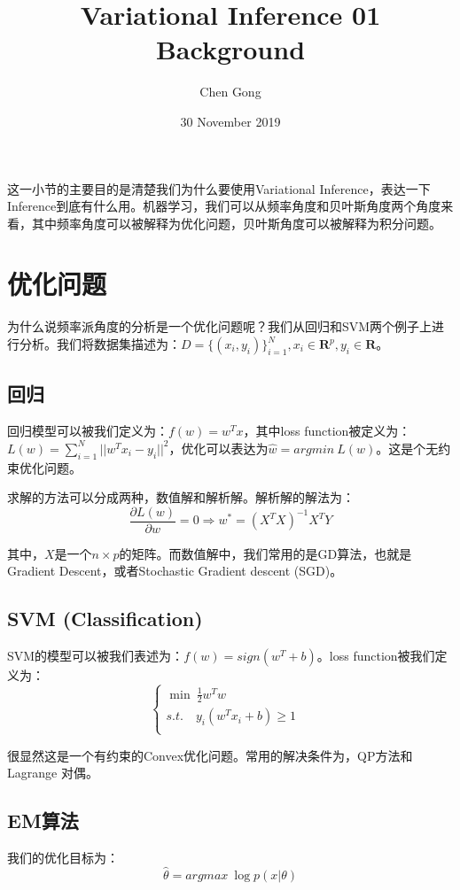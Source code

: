\documentclass[a4paper]{article}
\title{Variational Inference 01 Background}
\author{Chen Gong}
\date{30 November 2019}
\begin{document}
\maketitle

这一小节的主要目的是清楚我们为什么要使用Variational Inference，表达一下Inference到底有什么用。机器学习，我们可以从频率角度和贝叶斯角度两个角度来看，其中频率角度可以被解释为优化问题，贝叶斯角度可以被解释为积分问题。

\section{优化问题}
为什么说频率派角度的分析是一个优化问题呢？我们从回归和SVM两个例子上进行分析。我们将数据集描述为：$D = \{ (x_i,y_i) \}_{i=1}^N,x_i \in \mathbf{R}^p,y_i \in \mathbf{R}$。
\subsection{回归}
回归模型可以被我们定义为：$f(w) = w^Tx$，其中loss function被定义为：$L(w) = \sum_{i=1}^N || w^Tx_i - y_i ||^2$，优化可以表达为$\hat{w} = argmin\ L(w)$。这是个无约束优化问题。

求解的方法可以分成两种，数值解和解析解。解析解的解法为：
\begin{equation}
    \frac{\partial L(w)}{\partial w} = 0 \Rightarrow w^{\ast} = (X^TX)^{-1}X^TY
\end{equation}

其中，$X$是一个$n\times p$的矩阵。而数值解中，我们常用的是GD算法，也就是Gradient Descent，或者Stochastic Gradient descent (SGD)。

\subsection{SVM (Classification)}
SVM的模型可以被我们表述为：$f(w) = sign(w^T+b)$。loss function被我们定义为：
\begin{equation}
    \left\{
    \begin{array}{ll}
        \min\ \frac{1}{2}w^Tw & \\
        s.t. \quad y_i(w^Tx_i + b) \geq 1 & \\
    \end{array}
    \right.
\end{equation}

很显然这是一个有约束的Convex优化问题。常用的解决条件为，QP方法和Lagrange 对偶。

\subsection{EM算法}
我们的优化目标为：
\begin{equation}
    \hat{\theta} = argmax\ \log p(x|\theta)
\end{equation}
\end{document}
